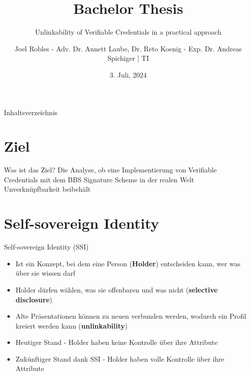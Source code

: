\documentclass[
	german,%
	authorontitle=true,
	]{bfhbeamer}
\title{Bachelor Thesis}
\subtitle{Unlinkability of Verifiable Credentials in a practical approach}
\author[J. Robles]{Joel Robles - Adv. Dr. Annett Laube, Dr. Reto Koenig - Exp. Dr. Andreas Spichiger | TI}
\date{3. Juli, 2024}
\begin{document}
\maketitle

\begin{frame}{Inhaltsverzeichnis}
    \tableofcontents
\end{frame}

\section{Ziel}

\begin{frame}{Was ist das Ziel?}
    \centering
    Die Analyse, ob eine Implementierung von Verifiable Credentials mit dem BBS Signature Scheme in der realen Welt Unverknüpfbarkeit beibehält
\end{frame}

\section{Self-sovereign Identity}

\begin{frame}{Self-sovereign Identity (SSI)}
    \begin{itemize}
        \item Ist ein Konzept, bei dem eine Person (\textbf{Holder}) entscheiden kann, wer was über sie wissen darf
        \item Holder dürfen wählen, was sie offenbaren und was nicht (\textbf{selective disclosure})
        \item Alte Präsentationen können zu neuen verbunden werden, wodurch ein Profil kreiert werden kann (\textbf{unlinkability})
        \item Heutiger Stand - Holder haben keine Kontrolle über ihre Attribute
        \item Zukünftiger Stand dank SSI - Holder haben volle Kontrolle über ihre Attribute
    \end{itemize}
\end{frame}
\end{document}
